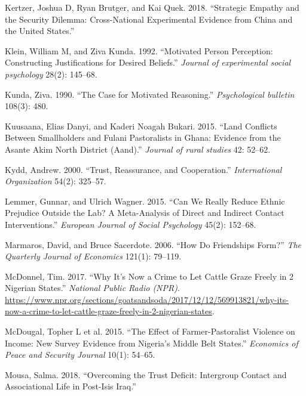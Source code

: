\documentclass[11pt]{article}
\begin{document}
\begin{cslreferences}
\leavevmode\hypertarget{ref-kertzer2018empathy}{}%
Kertzer, Joshua D, Ryan Brutger, and Kai Quek. 2018. ``Strategic Empathy
and the Security Dilemma: Cross-National Experimental Evidence from
China and the United States.''

\leavevmode\hypertarget{ref-klein1992motivated}{}%
Klein, William M, and Ziva Kunda. 1992. ``Motivated Person Perception:
Constructing Justifications for Desired Beliefs.'' \emph{Journal of
experimental social psychology} 28(2): 145--68.

\leavevmode\hypertarget{ref-kunda1990motivatedReasoning}{}%
Kunda, Ziva. 1990. ``The Case for Motivated Reasoning.''
\emph{Psychological bulletin} 108(3): 480.

\leavevmode\hypertarget{ref-kuusaana2015land}{}%
Kuusaana, Elias Danyi, and Kaderi Noagah Bukari. 2015. ``Land Conflicts
Between Smallholders and Fulani Pastoralists in Ghana: Evidence from the
Asante Akim North District (Aand).'' \emph{Journal of rural studies} 42:
52--62.

\leavevmode\hypertarget{ref-kydd2000trust}{}%
Kydd, Andrew. 2000. ``Trust, Reassurance, and Cooperation.''
\emph{International Organization} 54(2): 325--57.

\leavevmode\hypertarget{ref-lemmer2015can}{}%
Lemmer, Gunnar, and Ulrich Wagner. 2015. ``Can We Really Reduce Ethnic
Prejudice Outside the Lab? A Meta-Analysis of Direct and Indirect
Contact Interventions.'' \emph{European Journal of Social Psychology}
45(2): 152--68.

\leavevmode\hypertarget{ref-marmaros2006friendships}{}%
Marmaros, David, and Bruce Sacerdote. 2006. ``How Do Friendships Form?''
\emph{The Quarterly Journal of Economics} 121(1): 79--119.

\leavevmode\hypertarget{ref-mcdonnel2017graze}{}%
McDonnel, Tim. 2017. ``Why It's Now a Crime to Let Cattle Graze Freely
in 2 Nigerian States.'' \emph{National Public Radio (NPR)}.
\url{https://www.npr.org/sections/goatsandsoda/2017/12/12/569913821/why-its-now-a-crime-to-let-cattle-graze-freely-in-2-nigerian-states}.

\leavevmode\hypertarget{ref-mcdougal2015effect}{}%
McDougal, Topher L et al. 2015. ``The Effect of Farmer-Pastoralist
Violence on Income: New Survey Evidence from Nigeria's Middle Belt
States.'' \emph{Economics of Peace and Security Journal} 10(1): 54--65.

\leavevmode\hypertarget{ref-mousa2018overcome}{}%
Mousa, Salma. 2018. ``Overcoming the Trust Deficit: Intergroup Contact
and Associational Life in Post-Isis Iraq.''


\end{cslreferences}
\end{document}
